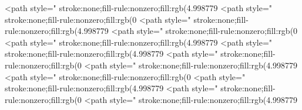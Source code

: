 <path style=" stroke:none;fill-rule:nonzero;fill:rgb(4.998779%
<path style=" stroke:none;fill-rule:nonzero;fill:rgb(0%
<path style=" stroke:none;fill-rule:nonzero;fill:rgb(4.998779%
<path style=" stroke:none;fill-rule:nonzero;fill:rgb(0%
<path style=" stroke:none;fill-rule:nonzero;fill:rgb(4.998779%
<path style=" stroke:none;fill-rule:nonzero;fill:rgb(4.998779%
<path style=" stroke:none;fill-rule:nonzero;fill:rgb(0%
<path style=" stroke:none;fill-rule:nonzero;fill:rgb(4.998779%
<path style=" stroke:none;fill-rule:nonzero;fill:rgb(0%
<path style=" stroke:none;fill-rule:nonzero;fill:rgb(4.998779%
<path style=" stroke:none;fill-rule:nonzero;fill:rgb(0%
<path style=" stroke:none;fill-rule:nonzero;fill:rgb(4.998779%
